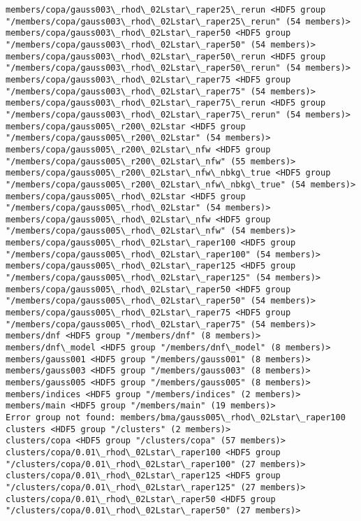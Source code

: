 \documentclass[11pt]{article}
\begin{document}
\begin{Verbatim}[commandchars=\\\{\}]
members/copa/gauss003\_rhod\_02Lstar\_raper25\_rerun <HDF5 group "/members/copa/gauss003\_rhod\_02Lstar\_raper25\_rerun" (54 members)>
members/copa/gauss003\_rhod\_02Lstar\_raper50 <HDF5 group "/members/copa/gauss003\_rhod\_02Lstar\_raper50" (54 members)>
members/copa/gauss003\_rhod\_02Lstar\_raper50\_rerun <HDF5 group "/members/copa/gauss003\_rhod\_02Lstar\_raper50\_rerun" (54 members)>
members/copa/gauss003\_rhod\_02Lstar\_raper75 <HDF5 group "/members/copa/gauss003\_rhod\_02Lstar\_raper75" (54 members)>
members/copa/gauss003\_rhod\_02Lstar\_raper75\_rerun <HDF5 group "/members/copa/gauss003\_rhod\_02Lstar\_raper75\_rerun" (54 members)>
members/copa/gauss005\_r200\_02Lstar <HDF5 group "/members/copa/gauss005\_r200\_02Lstar" (54 members)>
members/copa/gauss005\_r200\_02Lstar\_nfw <HDF5 group "/members/copa/gauss005\_r200\_02Lstar\_nfw" (55 members)>
members/copa/gauss005\_r200\_02Lstar\_nfw\_nbkg\_true <HDF5 group "/members/copa/gauss005\_r200\_02Lstar\_nfw\_nbkg\_true" (54 members)>
members/copa/gauss005\_rhod\_02Lstar <HDF5 group "/members/copa/gauss005\_rhod\_02Lstar" (54 members)>
members/copa/gauss005\_rhod\_02Lstar\_nfw <HDF5 group "/members/copa/gauss005\_rhod\_02Lstar\_nfw" (54 members)>
members/copa/gauss005\_rhod\_02Lstar\_raper100 <HDF5 group "/members/copa/gauss005\_rhod\_02Lstar\_raper100" (54 members)>
members/copa/gauss005\_rhod\_02Lstar\_raper125 <HDF5 group "/members/copa/gauss005\_rhod\_02Lstar\_raper125" (54 members)>
members/copa/gauss005\_rhod\_02Lstar\_raper50 <HDF5 group "/members/copa/gauss005\_rhod\_02Lstar\_raper50" (54 members)>
members/copa/gauss005\_rhod\_02Lstar\_raper75 <HDF5 group "/members/copa/gauss005\_rhod\_02Lstar\_raper75" (54 members)>
members/dnf <HDF5 group "/members/dnf" (8 members)>
members/dnf\_model <HDF5 group "/members/dnf\_model" (8 members)>
members/gauss001 <HDF5 group "/members/gauss001" (8 members)>
members/gauss003 <HDF5 group "/members/gauss003" (8 members)>
members/gauss005 <HDF5 group "/members/gauss005" (8 members)>
members/indices <HDF5 group "/members/indices" (2 members)>
members/main <HDF5 group "/members/main" (19 members)>
Error group not found: members/bma/gauss005\_rhod\_02Lstar\_raper100
clusters <HDF5 group "/clusters" (2 members)>
clusters/copa <HDF5 group "/clusters/copa" (57 members)>
clusters/copa/0.01\_rhod\_02Lstar\_raper100 <HDF5 group "/clusters/copa/0.01\_rhod\_02Lstar\_raper100" (27 members)>
clusters/copa/0.01\_rhod\_02Lstar\_raper125 <HDF5 group "/clusters/copa/0.01\_rhod\_02Lstar\_raper125" (27 members)>
clusters/copa/0.01\_rhod\_02Lstar\_raper50 <HDF5 group "/clusters/copa/0.01\_rhod\_02Lstar\_raper50" (27 members)>

\end{Verbatim}
\end{document}
